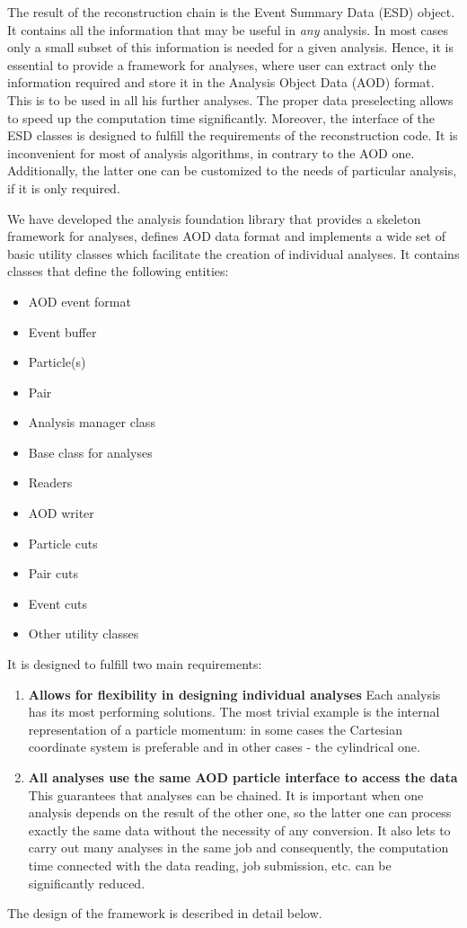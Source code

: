 \documentclass[12pt,a4paper,twoside]{article}
\begin{document}
{The result of the reconstruction chain is the Event Summary Data (ESD) 
object. It contains all the information that may
be useful in {\it any} analysis. In most cases only a small subset 
of this information is needed for a given analysis.
Hence, it is essential to provide a framework for analyses, where
user can extract only the information required and store it in 
the Analysis Object Data (AOD) format. This is to be used in all his
further analyses. The proper data preselecting allows to speed up 
the computation time significantly. Moreover, the interface of the ESD classes is
designed to fulfill the requirements of the reconstruction
code. It is inconvenient for most of analysis algorithms,
in contrary to the AOD one. Additionally, the latter one can be customized
to the needs of particular analysis, if it is only required.

We have developed the analysis foundation library that 
provides a skeleton framework for analyses, defines AOD data format
and implements a wide set of basic utility classes which facilitate 
the creation of individual analyses.
It contains classes that define the following entities:

\begin{itemize}
\item AOD event format
\item Event buffer
\item Particle(s)
\item Pair
\item Analysis manager class 
\item Base class for analyses
\item Readers 
\item AOD writer 
\item Particle cuts 
\item Pair cuts 
\item Event cuts 
\item Other utility classes 
\end{itemize}

It is designed to fulfill two main requirements:
% 
\begin{enumerate}
\item \textbf{Allows for flexibility in designing individual analyses} 
  Each analysis has its most performing solutions. The most trivial example is 
  the internal representation of a particle momentum: in some cases the Cartesian coordinate system  is preferable and in other cases - the cylindrical one.
\item \textbf{All analyses use the same AOD particle interface to access the data }
  This guarantees that analyses can be chained. It is important when
  one analysis depends on the result of the other one, so the latter one can 
  process exactly the same data without the necessity of any conversion. 
  It also lets to carry out many analyses in the same job and consequently, the 
  computation time connected with 
  the data reading, job submission, etc. can be significantly reduced.
\end{enumerate}
The design of the framework is described in detail below.


}
\end{document}
